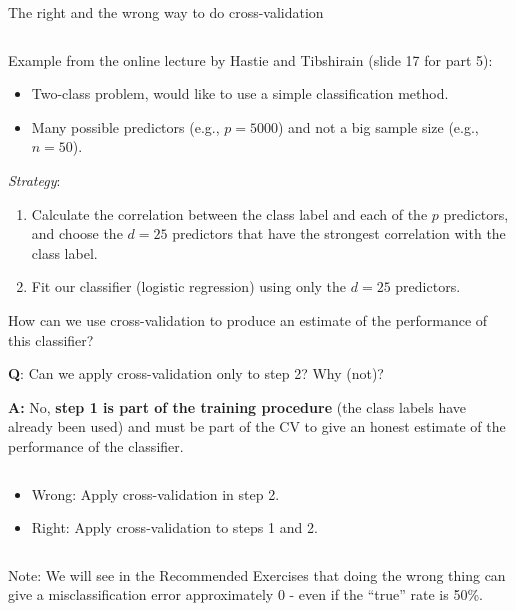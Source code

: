 \documentclass[10pt,ignorenonframetext,]{beamer}
\providecommand{\tightlist}{%
  \setlength{\itemsep}{0pt}\setlength{\parskip}{0pt}}
\begin{document}
\begin{frame}

\begin{block}{The right and the wrong way to do cross-validation}

\(~\)

Example from the online lecture by Hastie and Tibshirain (slide 17 for
part 5):

\vspace{2mm}

\begin{itemize}
\tightlist
\item
  Two-class problem, would like to use a simple classification method.
\item
  Many possible predictors (e.g., \(p=5000\)) and not a big sample size
  (e.g., \(n=50\)).
\end{itemize}

\vspace{2mm}

\emph{Strategy}:

\begin{enumerate}
\item
  Calculate the correlation between the class label and each of the
  \(p\) predictors, and choose the \(d=25\) predictors that have the
  strongest correlation with the class label.
\item
  Fit our classifier (logistic regression) using only the \(d=25\)
  predictors.
\end{enumerate}

\vspace{2mm}

How can we use cross-validation to produce an estimate of the
performance of this classifier?

\end{block}

\end{frame}

\begin{frame}

\textbf{Q}: Can we apply cross-validation only to step 2? Why (not)?

\textbf{A:} No, \textbf{step 1 is part of the training procedure} (the
class labels have already been used) and must be part of the CV to give
an honest estimate of the performance of the classifier.

\(~\)

\begin{itemize}
\tightlist
\item
  Wrong: Apply cross-validation in step 2.
\item
  Right: Apply cross-validation to steps 1 and 2.
\end{itemize}

\(~\)

Note: We will see in the Recommended Exercises that doing the wrong
thing can give a misclassification error approximately 0 - even if the
``true'' rate is 50\%.

\end{frame}
\end{document}
